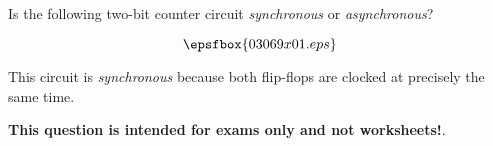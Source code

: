 

Is the following two-bit counter circuit {\it synchronous} or {\it asynchronous}?

$$\epsfbox{03069x01.eps}$$







This circuit is {\it synchronous} because both flip-flops are clocked at precisely the same time.







{\bf This question is intended for exams only and not worksheets!}.




